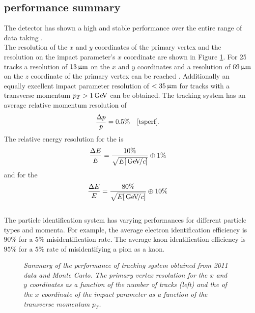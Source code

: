 \subsection{\lhcb performance summary}
The \lhcb detector has shown a high and stable performance over the entire range of data taking \cite{lhcbperf}.\\
The resolution of the $x$ and $y$ coordinates of the primary vertex and the resolution on the impact parameter's $x$ coordinate are shown in Figure \ref{fig:resolution}. For 25 tracks a resolution of $13 \,\upmu\rm m$ on the $x$ and $y$ coordinates and a resolution of $69 \,\upmu\rm m$ on the $z$ coordinate of the primary vertex can be reached \cite{veloperf}. Additionally an equally excellent impact parameter resolution of $<35 \,\upmu\rm m$ for tracks with a transverse momentum $p_T>1 \mathrm{\,Ge\kern -0.1em V}$ can be obtained. The tracking system has an average relative momentum resolution of
\begin{equation}
\frac{\Delta p}{p} = 0.5 \% \quad \cite{tsperf}.
\end{equation}
The relative energy resolution for the \ecal is
\begin{equation}
\frac{\Delta E}{E} = \frac{10 \%}{\sqrt{E[{\mathrm{\,Ge\kern -0.1em V\!/}c}]}} \oplus 1\%
\end{equation}
and for the \hcal
\begin{equation}
\frac{\Delta E}{E} = \frac{80 \%}{\sqrt{E[{\mathrm{\,Ge\kern -0.1em V\!/}c}]}} \oplus 10\%
\end{equation}
\\
The particle identification system has varying performances for different particle types and momenta. For example, the average electron identification efficiency is $90\%$ for a $5\%$ misidentification rate. The average kaon identification efficiency is $95\%$ for a $5\%$ rate of misidentifying a pion as a kaon.
\begin{figure}[ht]
  \begin{center}
  \vspace*{-1.0cm}
  \end{center}
  \caption{\textit{Summary of the performance of \lhcb tracking system obtained from 2011 data and Monte Carlo. The primary vertex resolution for the $x$ and $y$ coordinates as a function of the number of tracks (left) and the of the $x$ coordinate of the impact parameter as a function of the transverse momentum $p_T$.}\cite{veloperf}}
  \label{fig:resolution}
\end{figure}
\newpage
%
%
%
\vspace{0.5cm}

